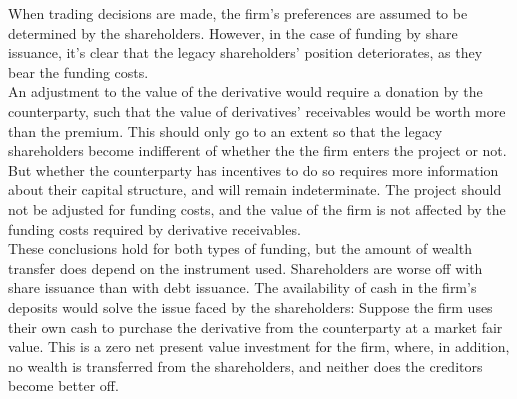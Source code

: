 \documentclass[../main.tex]{subfiles}
\begin{document}
        When trading decisions are made, the firm's preferences are assumed to be determined by the shareholders.
        However, in the case of funding by share issuance, it's clear that the legacy shareholders' position deteriorates, as they bear the funding costs.\\
        An adjustment to the value of the derivative would require a donation by the counterparty, such that the value of derivatives' receivables would be worth more than the premium.
        This should only go to an extent so that the legacy shareholders become indifferent of whether the the firm enters the project or not.
        But whether the counterparty has incentives to do so requires more information about their capital structure, and will remain indeterminate.
        The project should not be adjusted for funding costs, and the value of the firm is not affected by the funding costs required by derivative receivables.\\
        These conclusions hold for both types of funding, but the amount of wealth transfer does depend on the instrument used. Shareholders are worse off with share issuance than with debt issuance.
        The availability of cash in the firm's deposits would solve the issue faced by the shareholders:
        Suppose the firm uses their own cash to purchase the derivative from the counterparty at a market fair value.
        This is a zero net present value investment for the firm, where, in addition, no wealth is transferred from the shareholders, and neither does the creditors become better off. 
        
        
\end{document}
